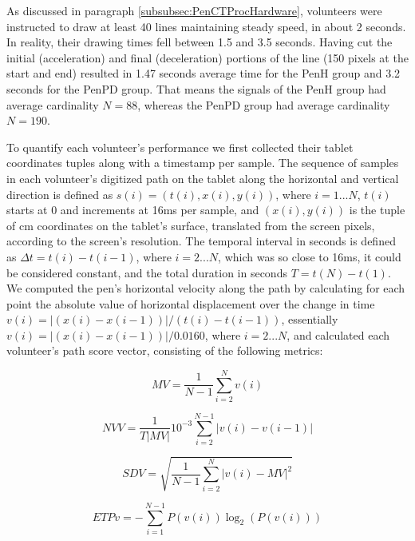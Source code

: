 As discussed in paragraph \ref{subsubsec:PenCTProcHardware}, volunteers were instructed to draw at least 40 lines maintaining steady speed, in about 2 seconds. In reality, their drawing times fell between 1.5 and 3.5 seconds. Having cut the initial (acceleration) and final (deceleration) portions of the line (150 pixels at the start and end) resulted in 1.47 seconds average time for the \gls{PenH} group and 3.2 seconds for the \gls{PenPD} group. That means the signals of the \gls{PenH} group had average cardinality $N=88$, whereas the \gls{PenPD} group had average cardinality $N=190$. 

To quantify each volunteer's performance we first collected their tablet coordinates tuples along with a timestamp per sample. The sequence of samples in each volunteer's digitized path on the tablet along the horizontal and vertical direction is defined as $s(i) = (t(i),x(i),y(i))$, where $i = 1...N$, $t(i)$ starts at 0 and increments at 16ms per sample, and $(x(i),y(i))$ is the tuple of cm coordinates on the tablet's surface, translated from the screen pixels, according to the screen's resolution. The temporal interval in seconds is defined as $\Delta t = t(i)-t(i-1)$, where $i = 2...N$, which was so close to 16ms, it could be considered constant, and the total duration in seconds $T = t(N)-t(1)$. We computed the pen's horizontal velocity along the path by calculating for each point the absolute value of horizontal displacement over the change in time $v(i)=|(x(i)-x(i-1))|/(t(i)-t(i-1))$, essentially $v(i)=|(x(i)-x(i-1))|/0.0160$, where $i = 2...N$, and calculated each volunteer's path score vector, consisting of the following metrics:


\begin{equation} \label{eq: MV}
MV = \frac{1}{N-1}\sum_{i=2}^{N}v(i)
\end{equation}

\begin{equation} \label{eq: NVV}
NVV = \frac{1}{T|MV|}10^{-3}\sum_{i=2}^{N-1}|v(i) - v(i-1)|
\end{equation}

\begin{equation} \label{eq: SDV}
SDV = \sqrt{\frac{1}{N-1}\sum_{i=2}^{N}|v(i)-MV|^{2}}
\end{equation}

\begin{equation} \label{eq: ETPv}
ETPv = -\sum_{i=1}^{N-1}P(v(i))\log_{2}(P(v(i)))
\end{equation}

